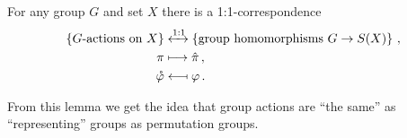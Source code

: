 \begin{lemma}
  \label{lemma: G-actions = group homos G -> S(X)}
  For any group $G$ and set $X$ there is a 1:1-correspondence
  \begin{align*}
      \left\{
        \text{$G$-actions on $X$}
      \right\}
    & \xleftrightarrow{1:1}
      \left\{
        \text{group homomorphisms $G \to S(X)$}
      \right\} \,,
    \\
      \pi
    & \longmapsto
      \hat{\pi} \,,
    \\
      \mathring{\varphi}
    & \longmapsfrom
      \varphi \,.
  \end{align*}
\end{lemma}


From this lemma we get the idea that group actions are ``the same'' as ``representing'' groups as permutation groups.



